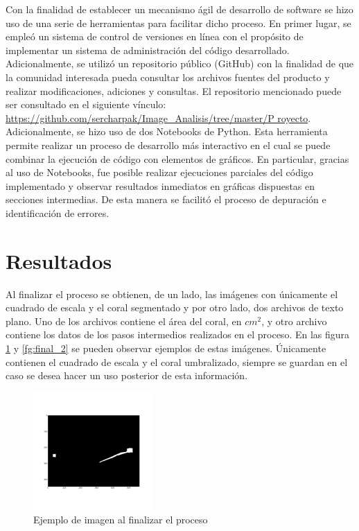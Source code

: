 \documentclass[journal]{IEEEtran}
\begin{document}
\begin{par}
Con la finalidad de establecer un mecanismo ágil de desarrollo de
software se hizo uso de una serie de herramientas para facilitar dicho
proceso. En primer lugar, se empleó un sistema de control de versiones en
línea con el propósito de implementar un sistema de administración del
código desarrollado. Adicionalmente, se utilizó un repositorio público
(GitHub) con la finalidad de que la comunidad interesada pueda consultar
los archivos fuentes del producto y realizar modificaciones, adiciones y
consultas. El repositorio mencionado puede ser consultado en el siguiente
vínculo: \url{https://github.com/sercharpak/Image_Analisis/tree/master/P
royecto}. Adicionalmente, se hizo uso de dos Notebooks de Python. Esta
herramienta permite realizar un proceso de desarrollo más interactivo en
el cual se puede combinar la ejecución de código con elementos de
gráficos. En particular, gracias al uso de Notebooks, fue posible
realizar ejecuciones parciales del código implementado y observar
resultados inmediatos en gráficas dispuestas en secciones intermedias. De
esta manera se facilitó el proceso de depuración e identificación de
errores.
\end{par}

\section{Resultados}

\begin{par}
Al finalizar el proceso se obtienen, de un lado, las imágenes con
únicamente el cuadrado de escala y el coral segmentado y por otro lado,
dos archivos de texto plano. Uno de los archivos contiene el área del
coral, en $cm^2$, y otro archivo contiene los datos de los pasos
intermedios realizados en el proceso. En las figura \ref{fg:final_1} y
\ref{fg:final_2} se pueden observar ejemplos de estas imágenes.
Únicamente contienen el cuadrado de escala y el coral umbralizado,
siempre se guardan en el caso se desea hacer un uso posterior de esta
información.
\end{par}

\begin{figure}[ht]
\begin{center}
\includegraphics[width=0.40\textwidth]{resultados/Coral_3_S3_final_image} %
\caption{Ejemplo de imagen al finalizar el proceso}
\label{fg:final_1}
\end{center}
\end{figure}
\FloatBarrier
\end{document}
